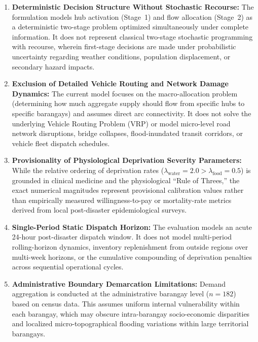 \begin{enumerate}
    \item \textbf{Deterministic Decision Structure Without Stochastic Recourse:}
    The formulation models hub activation (Stage~1) and flow allocation (Stage~2) as a deterministic two-stage problem optimized simultaneously under complete information. It does not represent classical two-stage stochastic programming with recourse, wherein first-stage decisions are made under probabilistic uncertainty regarding weather conditions, population displacement, or secondary hazard impacts.

    \item \textbf{Exclusion of Detailed Vehicle Routing and Network Damage Dynamics:}
    The current model focuses on the macro-allocation problem (determining how much aggregate supply should flow from specific hubs to specific barangays) and assumes direct arc connectivity. It does not solve the underlying Vehicle Routing Problem (VRP) or model micro-level road network disruptions, bridge collapses, flood-inundated transit corridors, or vehicle fleet dispatch schedules.

    \item \textbf{Provisionality of Physiological Deprivation Severity Parameters:}
    While the relative ordering of deprivation rates ($\lambda_{\text{water}} = 2.0 > \lambda_{\text{food}} = 0.5$) is grounded in clinical medicine and the physiological ``Rule of Threes,'' the exact numerical magnitudes represent provisional calibration values rather than empirically measured willingness-to-pay or mortality-rate metrics derived from local post-disaster epidemiological surveys.

    \item \textbf{Single-Period Static Dispatch Horizon:}
    The evaluation models an acute 24-hour post-disaster dispatch window. It does not model multi-period rolling-horizon dynamics, inventory replenishment from outside regions over multi-week horizons, or the cumulative compounding of deprivation penalties across sequential operational cycles.

    \item \textbf{Administrative Boundary Demarcation Limitations:}
    Demand aggregation is conducted at the administrative barangay level ($n = 182$) based on census data. This assumes uniform internal vulnerability within each barangay, which may obscure intra-barangay socio-economic disparities and localized micro-topographical flooding variations within large territorial barangays.
\end{enumerate}


